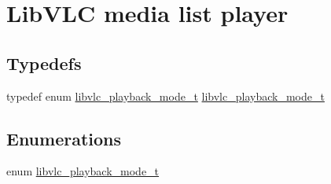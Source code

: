\hypertarget{group__libvlc__media__list__player}{}\section{Lib\+V\+LC media list player}
\label{group__libvlc__media__list__player}
\subsection*{Typedefs}
\begin{DoxyCompactItemize}
\item 
typedef enum \hyperlink{group__libvlc__media__list__player_ga1f0139f9220d7578fab37a3c1a74af9c}{libvlc\+\_\+playback\+\_\+mode\+\_\+t} \hyperlink{group__libvlc__media__list__player_gac1548e6f3b89aaa57779225fef404c2c}{libvlc\+\_\+playback\+\_\+mode\+\_\+t}
\end{DoxyCompactItemize}
\subsection*{Enumerations}
\begin{DoxyCompactItemize}
\item 
enum \hyperlink{group__libvlc__media__list__player_ga1f0139f9220d7578fab37a3c1a74af9c}{libvlc\+\_\+playback\+\_\+mode\+\_\+t} 
\end{DoxyCompactItemize}
